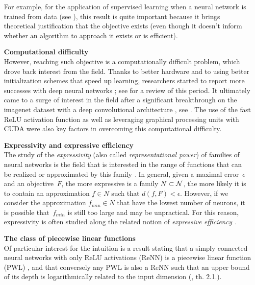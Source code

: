For example, for the application of supervised learning when a neural network is trained from data (see ), this result is quite important because it brings theoretical justification that the objective exists (even though it doesn't inform whether an algorithm to approach it exists or is efficient).

\begin{remark}\textbf{Computational difficulty}\\
However, reaching such objective is a computationally difficult problem, which drove back interest from the field. Thanks to better hardware and to using better initialization schemes that speed up learning, researchers started to report more successes with deep neural networks \citep{hinton2006fast,glorot2010understanding} ; see \citep{bengio2009learning} for a review of this period. It ultimately came to a surge of interest in the field after a significant breakthrough on the imagenet dataset \citep{deng2009imagenet} with a deep convolutional architecture \citep{krizhevsky2012imagenet}, see . The use of the fast ReLU activation function \citep{glorot2011deep} as well as leveraging graphical processing units with CUDA \citep{nickolls2008scalable} were also key factors in overcoming this computational difficulty.
\end{remark}

\begin{remark}\textbf{Expressivity and expressive efficiency}\\
The study of the \emph{expressivity} (also called \emph{representational power}) of families of neural networks is the field that is interested in the range of functions that can be realized or approximated by this family \citep{haastad1991power,pascanu2013number}. In general, given a maximal error~$\epsilon$ and an objective~$F$, the more expressive is a family $N \subset \mathcal{N}$, the more likely it is to contain an approximation $f \in N$ such that $d(f,F) < \epsilon$. However, if we consider the approximation $f_{min} \in N$ that have the lowest number of neurons, it is possible that~$f_{min}$ is still too large and may be unpractical. For this reason, expressivity is often studied along the related notion of \emph{expressive efficiency} \citep{delalleau2011shallow,cohen2018boosting}.
\label{rem:expr}
\end{remark}

\begin{remark}\textbf{The class of piecewise linear functions}\\
Of particular interest for the intuition is a result stating that a simply connected neural networks with only ReLU activations (ReNN) is a piecewise linear function (PWL) \citep{pascanu2013number,montufar2014number}, and that conversely any PWL is also a ReNN such that an upper bound of its depth is logarithmically related to the input dimension (\cite{arora2018understanding}, th. 2.1.).
\end{remark}

